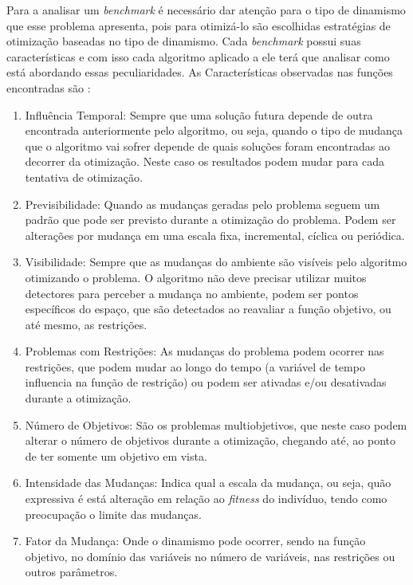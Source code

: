 Para a analisar um \textit{benchmark} é necessário dar atenção para o tipo de dinamismo que esse problema apresenta, pois para otimizá-lo são escolhidas estratégias de otimização baseadas no tipo de dinamismo. Cada \textit{benchmark} possui suas características e com isso cada algoritmo aplicado a ele terá que analisar como está abordando essas peculiaridades. As Características observadas nas funções encontradas são \cite{cruz2011optimization}:

\begin{enumerate}
\item Influência Temporal: Sempre que uma solução futura depende de outra encontrada anteriormente pelo algoritmo, ou seja, quando o tipo de mudança que o algoritmo vai sofrer depende de quais soluções foram encontradas ao decorrer da otimização. Neste caso os resultados podem mudar para cada tentativa de otimização.

\item Previsibilidade: Quando as mudanças geradas pelo problema seguem um padrão que pode ser previsto durante a otimização do problema. Podem ser alterações por mudança em uma escala fixa, incremental, cíclica ou periódica.

\item Visibilidade: Sempre que as mudanças do ambiente são visíveis pelo algoritmo otimizando o problema. O algoritmo não deve precisar utilizar muitos detectores para perceber a mudança no ambiente, podem ser pontos específicos do espaço, que são detectados ao reavaliar a função objetivo, ou até mesmo, as restrições.

\item Problemas com Restrições: As mudanças do problema podem ocorrer nas restrições, que podem mudar ao longo do tempo (a variável de tempo influencia na função de restrição) ou podem ser ativadas e/ou desativadas durante a otimização.

\item Número de Objetivos: São os problemas multiobjetivos, que neste caso podem alterar o número de objetivos durante a otimização, chegando até, ao ponto de ter somente um objetivo em vista.

\item Intensidade das Mudanças: Indica qual a escala da mudança, ou seja, quão expressiva é está alteração em relação ao \textit{fitness} do indivíduo, tendo como preocupação o limite das mudanças.

\item Fator da Mudança: Onde o dinamismo pode ocorrer, sendo na função objetivo, no domínio das variáveis no número de variáveis, nas restrições ou outros parâmetros.  
\end{enumerate}


